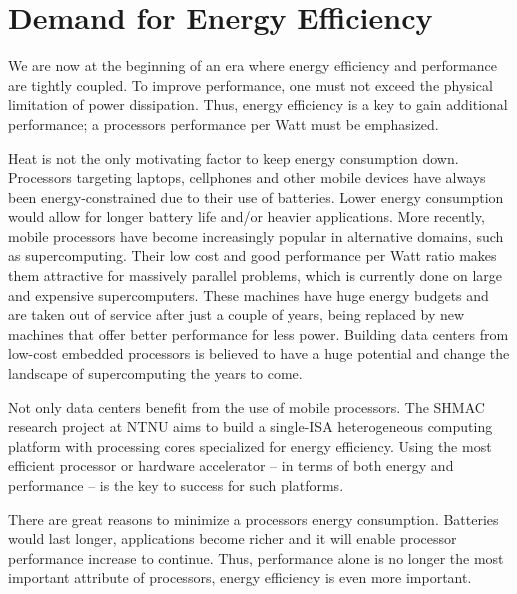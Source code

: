\section{Demand for Energy Efficiency}

We are now at the beginning of an era where energy efficiency and performance
are tightly coupled. To improve performance, one must not exceed the physical
limitation of power dissipation. Thus, energy efficiency is a key to gain
additional performance; a processors performance per Watt must be emphasized.

Heat is not the only motivating factor to keep energy consumption down.
Processors targeting laptops, cellphones and other mobile devices have always
been energy-constrained due to their use of batteries. Lower energy consumption
would allow for longer battery life and/or heavier applications. More recently,
mobile processors have become increasingly popular in alternative domains,
such as supercomputing. Their low cost and good performance per Watt ratio makes
them attractive for massively parallel problems, which is currently done on
large and expensive supercomputers. These machines have huge energy budgets and
are taken out of service after just a couple of years, being replaced by new
machines that offer better performance for less power. Building data centers
from low-cost embedded processors is believed to have a huge potential and
change the landscape of supercomputing the years to come.

Not only data centers benefit from the use of mobile processors. The SHMAC
research project at NTNU aims to build a single-ISA heterogeneous computing
platform with processing cores specialized for energy efficiency. Using the most
efficient processor or hardware accelerator -- in terms of both energy and
performance -- is the key to success for such platforms.

There are great reasons to minimize a processors energy consumption. Batteries
would last longer, applications become richer and it will enable processor
performance increase to continue. Thus, performance alone is no longer the most
important attribute of processors, energy efficiency is even more important.

